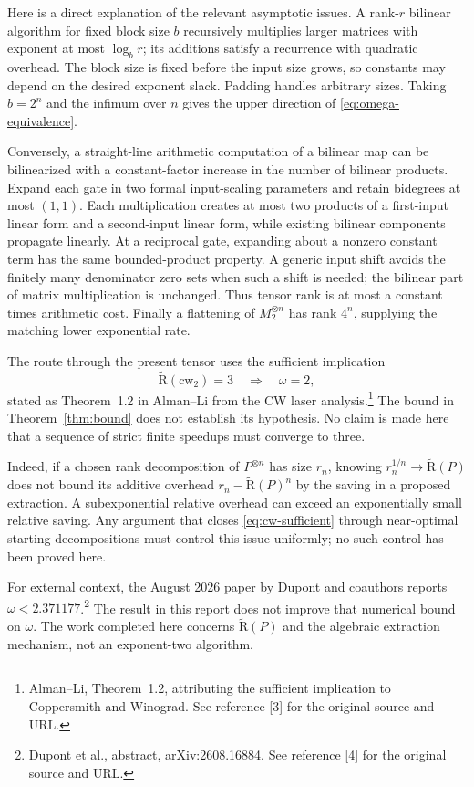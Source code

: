 \documentclass[11pt]{article}
\theoremstyle{definition}\newtheorem{definition}[theorem]{Definition}
\theoremstyle{remark}\newtheorem{remark}[theorem]{Remark}
\newcommand{\AR}{\widetilde{\mathrm R}}
\newcommand{\sref}[2]{\footnote{#1. See reference [#2] for the original source and URL.}}
\begin{document}
Here is a direct explanation of the relevant asymptotic issues. A rank-$r$ bilinear algorithm for fixed block size $b$ recursively multiplies larger matrices with exponent at most $\log_b r$; its additions satisfy a recurrence with quadratic overhead. The block size is fixed before the input size grows, so constants may depend on the desired exponent slack. Padding handles arbitrary sizes. Taking $b=2^n$ and the infimum over $n$ gives the upper direction of \eqref{eq:omega-equivalence}.

Conversely, a straight-line arithmetic computation of a bilinear map can be bilinearized with a constant-factor increase in the number of bilinear products. Expand each gate in two formal input-scaling parameters and retain bidegrees at most $(1,1)$. Each multiplication creates at most two products of a first-input linear form and a second-input linear form, while existing bilinear components propagate linearly. At a reciprocal gate, expanding about a nonzero constant term has the same bounded-product property. A generic input shift avoids the finitely many denominator zero sets when such a shift is needed; the bilinear part of matrix multiplication is unchanged. Thus tensor rank is at most a constant times arithmetic cost. Finally a flattening of $M_2^{\otimes n}$ has rank $4^n$, supplying the matching lower exponential rate.

The route through the present tensor uses the sufficient implication
\begin{equation}\label{eq:cw-sufficient}
 \AR(\mathrm{cw}_2)=3\quad\Longrightarrow\quad\omega=2,
\end{equation}
stated as Theorem~1.2 in Alman--Li from the CW laser analysis.\sref{Alman--Li, Theorem~1.2, attributing the sufficient implication to Coppersmith and Winograd}{3} The bound in Theorem~\ref{thm:bound} does not establish its hypothesis. No claim is made here that a sequence of strict finite speedups must converge to three.

Indeed, if a chosen rank decomposition of $P^{\otimes n}$ has size $r_n$, knowing $r_n^{1/n}\to\AR(P)$ does not bound its additive overhead $r_n-\AR(P)^n$ by the saving in a proposed extraction. A subexponential relative overhead can exceed an exponentially small relative saving. Any argument that closes \eqref{eq:cw-sufficient} through near-optimal starting decompositions must control this issue uniformly; no such control has been proved here.

For external context, the August 2026 paper by Dupont and coauthors reports $\omega<2.371177$.\sref{Dupont et al., abstract, arXiv:2608.16884}{4} The result in this report does not improve that numerical bound on $\omega$. The work completed here concerns $\AR(P)$ and the algebraic extraction mechanism, not an exponent-two algorithm.
\end{document}
